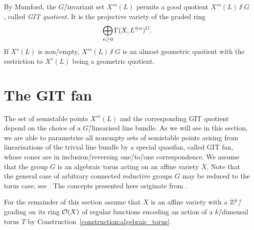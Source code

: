 \begin{remark}
	\label{remark:semistable_points_yield_git_quotient}
	By Mumford, the $G$\=/invariant set $X^{ss}(L)$ permits a good quotient $X^{ss}(L)\sslash G$, called \emph{GIT quotient}. It is the projective variety of the graded ring
	$$\bigoplus_{n\geq 0} \Gamma(X,L^{\otimes n})^G.$$
	If  $X^{s}(L)$ is non\=/empty, $X^{ss}(L)\sslash G$ is an almost geometric quotient with the restriction to $X^{s}(L)$ being a geometric quotient.
\end{remark}

\section{The GIT fan}
\label{sec:git_fan}

The set of semistable points $X^{ss}(L)$ and the corresponding GIT quotient depend on the choice of a $G$\=/linearised line bundle. As we will see in this section, we are able to parametrise all nonempty sets of semistable points arising from linearisations of the trivial line bundle by a special quasifan, called GIT fan, whose cones are in inclusion\=/reversing one\=/to\=/one correspondence. We assume that the group $G$ is an algebraic torus acting on an affine variety $X$. Note that the general case of arbitrary connected reductive groups $G$ may be reduced to the torus case, see \cite[Lemma 3.3]{git_via_cox_rings}. The concepts presented here originate from \cite[chapter 2]{git_equivalence}.

For the remainder of this section assume that $X$ is an affine variety with a $\mathbb{Z}^k$\=/grading on its ring $\mathcal{O}(X)$ of regular functions encoding an action of a $k$\=/dimensal torus $T$ by Construction~\ref{construction:algebraic_torus}.

